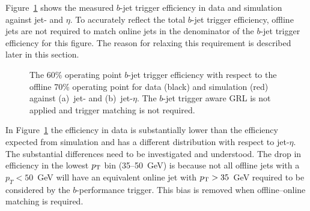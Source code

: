Figure~\ref{fig:trig-Full_noGRL_eff_noHLTMatch} shows the measured $b$-jet trigger efficiency in data and simulation against jet-\pT{} and $\eta$.
To accurately reflect the total $b$-jet trigger efficiency, %
offline jets are not required to match online jets in the denominator of the $b$-jet trigger efficiency for this figure.
The reason for relaxing this requirement is described later in this section.

\begin{figure}[!htb]
  \begin{center}
    \captionsetup[subfigure]{aboveskip=0pt,justification=centering}
  \end{center}
  \vspace{-1em}
  \caption[The $b$-jet trigger efficiency in data and simulation
    when the $b$-jet trigger aware GRL is not applied and trigger matching is not required.]
  {The 60\% operating point $b$-jet trigger efficiency with respect to the offline 70\% operating point
    for data (black) and simulation (red) against (a)~jet-\pT{} and (b)~jet-$\eta$.
    The $b$-jet trigger aware GRL is not applied and trigger matching is not required.}
  \label{fig:trig-Full_noGRL_eff_noHLTMatch}
\end{figure}


In Figure~\ref{fig:trig-Full_noGRL_eff_noHLTMatch} the efficiency in data is substantially lower
than the efficiency expected from  simulation and has a different distribution with respect to jet-$\eta$.
The substantial differences need to be investigated and understood. 
The drop in efficiency in the lowest $p_{\mathrm{T}}$ bin (35--50~GeV) is because not all offline jets with a $p_T < 50$~GeV  will have an 
equivalent online jet with $p_{\mathrm{T}}{} > 35$~GeV required to be considered by the $b$-performance trigger. This bias is removed when offline--online matching is required.


